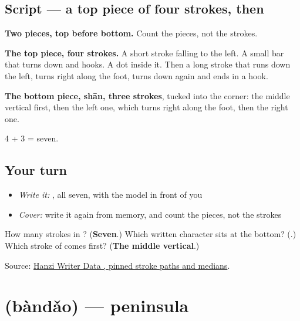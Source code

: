 \subsection*{Script — a top piece of four strokes, then }

\begin{quote}
\end{quote}

\textbf{Two pieces, top before bottom.} Count the pieces, not the strokes.

\textbf{The top piece, four strokes.} A short stroke falling to the left. A small bar that turns down and hooks. A dot inside it. Then a long stroke that runs down the left, turns right along the foot, turns down again and ends in a hook.

\textbf{The bottom piece,  shān, three strokes}, tucked into the corner: the middle vertical first, then the left one, which turns right along the foot, then the right one.

4 + 3 = seven.

\subsection*{Your turn}
\begin{itemize}
\raggedright
  \item \emph{Write it:} , all seven, with the model in front of you
  \item \emph{Cover:} write it again from memory, and count the pieces, not the strokes
\end{itemize}

\begin{tcolorbox}[breakable,colback=teal!4,colframe=teal!35!black,title={Before you move on}]
How many strokes in ? (\textbf{Seven}.) Which written character sits at the bottom? (\textbf{}.) Which stroke of  comes first? (\textbf{The middle vertical}.)

Source: \href{https://raw.githubusercontent.com/chanind/hanzi-writer-data/68d10a4b21150cae5e1ebbd223eed289cf32d90c/data/\%E5\%B2\%9B.json}{Hanzi Writer Data , pinned stroke paths and medians}.
\end{tcolorbox}
\section[\texorpdfstring{\zh{半岛} (bàndǎo)}{半岛 (bàndǎo)}]{ (bàndǎo) — peninsula}

